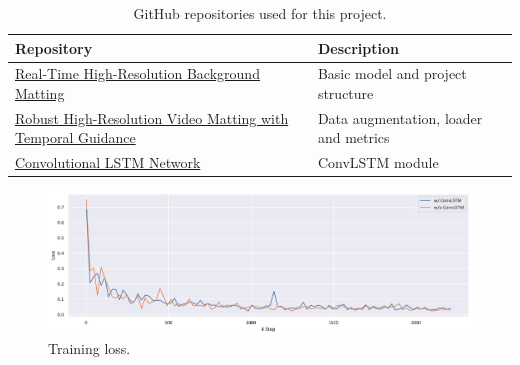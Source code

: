 \documentclass[final]{cvpr}
\begin{document}
\begin{table}[htb]
    \centering
    \caption{GitHub repositories used for this project.}
    \label{repository}
    \begin{tabular}{ll}
        \toprule
        Repository                                                                                                                                                & Description                           \\
        \midrule
        \href{https://github.com/PeterL1n/BackgroundMattingV2}{Real-Time High-Resolution Background Matting}\cite{linRealTimeHighResolutionBackground2020a}       & Basic model and project structure     \\
        \href{https://github.com/PeterL1n/RobustVideoMatting}{Robust High-Resolution Video Matting with Temporal Guidance}\cite{linRobustHighResolutionVideo2021} & Data augmentation, loader and metrics \\
        \href{https://github.com/ndrplz/ConvLSTM_pytorch}{Convolutional LSTM Network}\cite{shiConvolutionalLSTMNetwork2015}                                       & ConvLSTM module                       \\
        \bottomrule
    \end{tabular}
\end{table}

\begin{figure}[htb]
    \begin{center}
        \includegraphics[width=1\textwidth]{img/runs.pdf}
    \end{center}
    \caption{Training loss.}
    \label{runs}
\end{figure}
\end{document}
